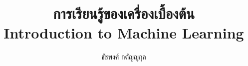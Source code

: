 
\documentclass[oldfontcommands,a4paper,14pt]{memoir}

\usepackage{float} %
\usepackage{amsmath} %
 \usepackage{polynom} %
\usepackage{polyglossia} %
\usepackage{color} %
\usepackage[colorlinks=true, linkcolor=blue]{hyperref} %
\usepackage{paralist} %

\usepackage{fontspec}  %

\usepackage{mathptmx} %

\newcommand\hmmax{0}
\usepackage{bm} %
\usepackage{amsfonts} %
\usepackage[usenames,dvipsnames]{xcolor} %

\usepackage[top=25mm, bottom=20mm, left=20mm, right=20mm]{geometry} %
\XeTeXlinebreaklocale "th"  %
\XeTeXlinebreakskip = 0pt plus 1pt %

\usepackage{framed,color}  %

\usepackage{mdframed}  %

\usepackage[all]{xy}  %

\usepackage{multicol}

\title{การเรียนรู้ของเครื่องเบื้องต้น\\
Introduction to Machine Learning}
\author{ธัชพงศ์ กตัญญูกุล}

\setdefaultlanguage{thai}  %

\newfontfamily{\thaifont}[Mapping=tex-text]{TH Sarabun New}

